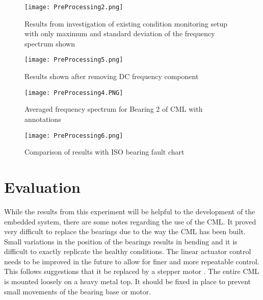 \begin{figure}
    \centering
    \texttt{[image: PreProcessing2.png]}
    \caption{Results from investigation of existing condition monitoring setup with only maximum and standard deviation of the frequency spectrum shown}
    \label{fig:PP2}
\end{figure}

\begin{figure}
    \centering
    \texttt{[image: PreProcessing5.png]}
    \caption{Results shown after removing DC frequency component}
    \label{fig:PP5}
\end{figure}

\begin{figure}
    \centering
    \texttt{[image: PreProcessing4.PNG]}
    \caption{Averaged frequency spectrum for Bearing 2 of CML with annotations}
    \label{fig:PP4}
\end{figure}

\begin{figure}
    \centering
    \texttt{[image: PreProcessing6.png]}
    \caption{Comparison of results with ISO bearing fault chart}
    \label{fig:PP6}
\end{figure}

\section{Evaluation}

While the results from this experiment will be helpful to the development of the embedded system, there are some notes regarding the use of the CML.
It proved very difficult to replace the bearings due to the way the CML has been built.
Small variations in the position of the bearings results in bending and it is difficult to exactly replicate the healthy conditions.
The linear actuator control needs to be improved in the future to allow for finer and more repeatable control.
This follows suggestions that it be replaced by a stepper motor \cite{CMlab}.
The entire CML is mounted loosely on a heavy metal top.
It should be fixed in place to prevent small movements of the bearing base or motor.